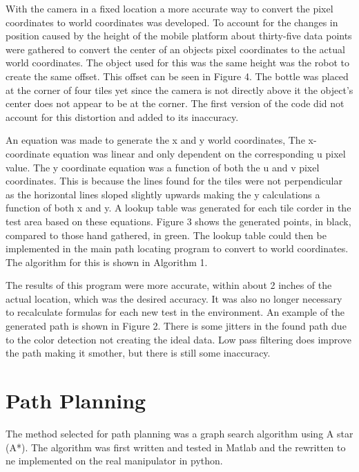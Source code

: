 \documentclass[letterpaper,12pt]{report}
\begin{document}
With the camera in a fixed location a more accurate way to convert the pixel coordinates to world coordinates was developed. To account for the changes in position caused by the height of the mobile platform about thirty-five data points were gathered to convert the center of an objects pixel coordinates to the actual world coordinates. The object used for this was the same height was the robot to create the same offset. This offset can be seen in Figure 4. The bottle was placed at the corner of four tiles yet since the camera is not directly above it the object's center does not appear to be at the corner. The first version of the code did not account for this distortion and added to its inaccuracy. 

An equation was made to generate the x and y world coordinates, The x-coordinate equation was linear and only dependent on the corresponding u pixel value. The y coordinate equation was a function of both the u and v pixel coordinates. This is because the lines found for the tiles were not perpendicular as the horizontal lines sloped slightly upwards making the y calculations a function of both x and y. A lookup table was generated for each tile corder in the test area based on these equations. Figure 3 shows the generated points, in black, compared to those hand gathered, in green. The lookup table could then be implemented in the main path locating program to convert to world coordinates. The algorithm for this is shown in Algorithm 1.

The results of this program were more accurate, within about 2 inches of the actual location, which was the desired accuracy. It was also no longer necessary to recalculate formulas for each new test in the environment. An example of the generated path is shown in Figure 2. There is some jitters in the found path due to the color detection not creating the ideal data. Low pass filtering does improve the path making it smother, but there is still some inaccuracy. 

\chapter{Path Planning}
The method selected for path planning was a graph search algorithm using A star (A*). The algorithm was first written and tested in Matlab and the rewritten to ne implemented on the real manipulator in python. 
\end{document}
